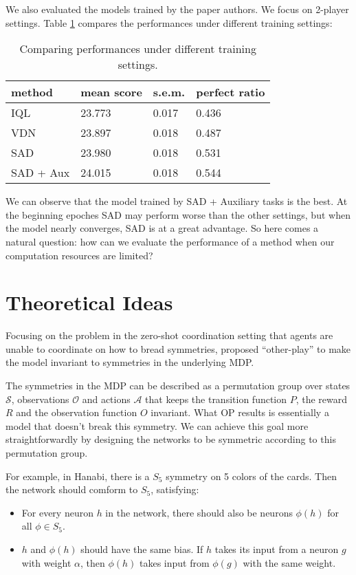 \documentclass[12pt]{article}
\begin{document}
We also evaluated the models trained by the paper authors\citep{hu2020simplified}. We focus on 2-player settings. Table \ref{Tab2} compares the performances under different training settings:
\begin{table}[H]
\begin{centering}
\begin{tabular}{|l|l|l|l|}
\hline
method & mean score & s.e.m. & perfect ratio \\ \hline
IQL & 23.773 & 0.017 & 0.436 \\ \hline
VDN & 23.897 & 0.018 & 0.487 \\ \hline
SAD & 23.980 & 0.018 & 0.531 \\ \hline
SAD + Aux & 24.015 & 0.018 & 0.544 \\ \hline
\end{tabular}
\caption{Comparing performances under different training settings.}
\label{Tab2}
\end{centering}
\end{table}

We can observe that the model trained by SAD + Auxiliary tasks is the best. At the beginning epoches SAD may perform worse than the other settings, but when the model nearly converges, SAD is at a great advantage. So here comes a natural question: how can we evaluate the performance of a method when our computation resources are limited?

\section{Theoretical Ideas}
\renewcommand\S{{\mathcal S}}
\renewcommand\O{{\mathcal O}}
\newcommand\A{{\mathcal A}}

  Focusing on the problem in the zero-shot coordination setting that agents are unable to coordinate on how to bread symmetries, \cite{hu2020other} proposed ``other-play'' to make the model invariant to symmetries in the underlying MDP.

  The symmetries in the MDP can be described as a permutation group over states $\S$, observations $\O$ and actions $\A$ that keeps the transition function $P$, the reward $R$ and the observation function $O$ invariant. What OP results is essentially a model that doesn't break this symmetry. We can achieve this goal more straightforwardly by designing the networks to be symmetric according to this permutation group.

  For example, in Hanabi, there is a $S_5$ symmetry on 5 colors of the cards. Then the network should comform to $S_5$, satisfying:
  \begin{itemize}
	\item For every neuron $h$ in the network, there should also be neurons $\phi(h)$ for all $\phi\in S_5$.
	\item $h$ and $\phi(h)$ should have the same bias. If $h$ takes its input from a neuron $g$ with weight $\alpha$, then $\phi(h)$ takes input from $\phi(g)$ with the same weight.
  \end{itemize}
\end{document}
